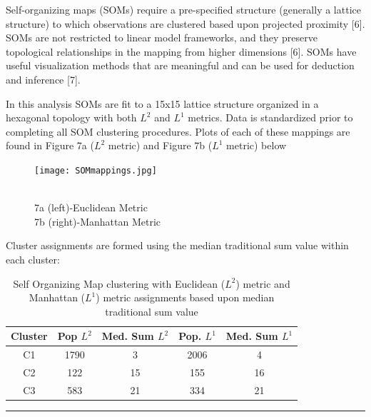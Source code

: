 \documentclass[12pt,]{article}
\begin{document}
Self-organizing maps (SOMs) require a pre-specified structure (generally
a lattice structure) to which observations are clustered based upon
projected proximity {[}6{]}. SOMs are not restricted to linear model
frameworks, and they preserve topological relationships in the mapping
from higher dimensions {[}6{]}. SOMs have useful visualization methods
that are meaningful and can be used for deduction and inference {[}7{]}.

In this analysis SOMs are fit to a 15x15 lattice structure organized in
a hexagonal topology with both \(L^{2}\) and \(L^{1}\) metrics. Data is
standardized prior to completing all SOM clustering procedures. Plots of
each of these mappings are found in Figure 7a (\(L^{2}\) metric) and
Figure 7b (\(L^{1}\) metric) below

\begin{figure}[h!]
\begin{center}
\texttt{[image: SOMmappings.jpg]}
\end{center}
\caption[15x15 Self Organizing Maps with hexagonal topologies]{\\ 7a (left)-Euclidean Metric \\ 7b (right)-Manhattan Metric}
\end{figure}

Cluster assignments are formed using the median traditional sum value
within each cluster:

\begin{table}[h!]
\begin{center}
\begin{tabular}{|c|c|c|c|c|}
\hline
Cluster &  Pop $L^{2}$ & Med. Sum  $L^{2}$ & Pop. $L^{1}$ & Med. Sum $L^{1}$\\
\hline
\hline
C1 & 1790 & 3 & 2006 & 4\\
\hline
C2 & 122 & 15 & 155 & 16 \\
\hline
C3 & 583 & 21 & 334 & 21 \\
\hline
\end{tabular}
\end{center}
\caption[Self Organizing Map Cluster assignments]{Self Organizing Map clustering with Euclidean ($L^{2}$) metric and Manhattan ($L^{1}$) metric assignments based upon median traditional sum value}
\end{table}

\begin{center}\rule{0.5\linewidth}{\linethickness}\end{center}

\newpage
\end{document}
